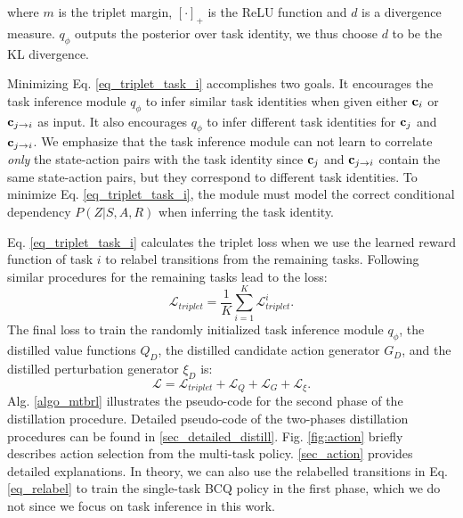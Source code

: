 where $m$ is the triplet margin, $[\cdot]_{+}$ is the ReLU function and $d$ is a divergence measure. $q_\phi$ outputs the posterior over task identity, we thus choose $d$ to be the KL divergence.

Minimizing Eq. \ref{eq_triplet_task_i} accomplishes two goals. It encourages the task inference module $q_\phi$ to infer similar task identities when given either ${\bf c}_i$ or ${\bf c}_{j\rightarrow{i}}$ as input. It also encourages $q_\phi$ to infer different task identities for ${\bf c}_j$ and ${\bf c}_{j\rightarrow{i}}$. We emphasize that the task inference module can not learn to correlate \textit{only} the state-action pairs with the task identity since ${\bf c}_j$ and ${\bf c}_{j\rightarrow{i}}$ contain the same state-action pairs, but they correspond to different task identities. To minimize Eq. \ref{eq_triplet_task_i}, the module must model the correct conditional dependency $P(Z|S, A, R)$ when inferring the task identity.

Eq. \ref{eq_triplet_task_i} calculates the triplet loss when we use the learned reward function of task $i$ to relabel transitions from the remaining tasks. Following similar procedures for the remaining tasks lead to the loss:
\begin{equation}\label{eq_triplet_all_task}
    \mathcal{L}_{triplet} =  \frac{1}{K} \sum_{i=1}^{K} \mathcal{L}^i_{triplet}.
\end{equation}
The final loss to train the randomly initialized task inference module $q_\phi$, the distilled value functions $Q_D$, the distilled candidate action generator $G_D$, and the distilled perturbation generator $\xi_D$ is:
\begin{equation}\label{eq_loss_final}
    \mathcal{L} = \mathcal{L}_{triplet} + \mathcal{L}_Q + \mathcal{L}_G + \mathcal{L}_\xi.
\end{equation}
Alg. \ref{algo_mtbrl} illustrates the pseudo-code for the second phase of the distillation procedure. Detailed pseudo-code of the two-phases distillation procedures can be found in \autoref{sec_detailed_distill}. Fig. \ref{fig:action} briefly describes action selection from the multi-task policy. \autoref{sec_action} provides detailed explanations. In theory, we can also use the relabelled transitions in Eq. \ref{eq_relabel} to train the single-task BCQ policy in the first phase, which we do not since we focus on task inference in this work.
